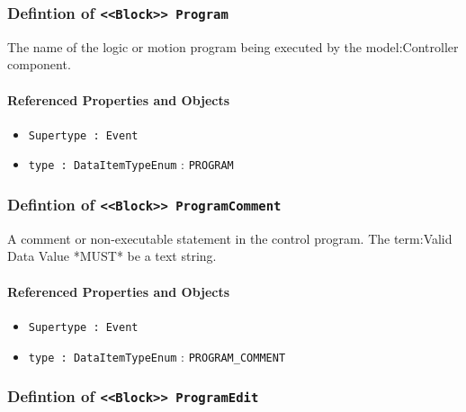 \subsubsection{Defintion of \texttt{<<Block>> Program}}
  \label{type:Program}

\FloatBarrier

The name of the logic or motion program being executed by the {model:Controller} component.

\FloatBarrier
\paragraph{Referenced Properties and Objects}

\begin{itemize}
\item \texttt{Supertype : Event}

\item \texttt{type : DataItemTypeEnum} : \texttt{PROGRAM}

\end{itemize}
\FloatBarrier
\subsubsection{Defintion of \texttt{<<Block>> ProgramComment}}
  \label{type:ProgramComment}

\FloatBarrier

A comment or non-executable statement in the control program.
 The {term:Valid Data Value} *MUST* be a text string.

\FloatBarrier
\paragraph{Referenced Properties and Objects}

\begin{itemize}
\item \texttt{Supertype : Event}

\item \texttt{type : DataItemTypeEnum} : \texttt{PROGRAM_COMMENT}

\end{itemize}
\FloatBarrier
\subsubsection{Defintion of \texttt{<<Block>> ProgramEdit}}
  \label{type:ProgramEdit}

\FloatBarrier

